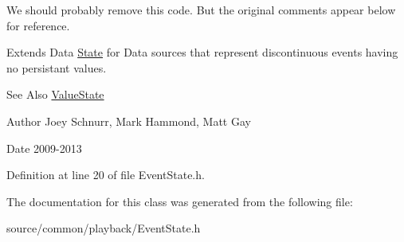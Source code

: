 We should probably remove this code. But the original comments appear below for reference.

Extends Data \hyperlink{class_picto_1_1_state}{State} for Data sources that represent discontinuous events having no persistant values. \begin{DoxySeeAlso}{See Also}
\hyperlink{class_picto_1_1_value_state}{Value\-State} 
\end{DoxySeeAlso}
\begin{DoxyAuthor}{Author}
Joey Schnurr, Mark Hammond, Matt Gay 
\end{DoxyAuthor}
\begin{DoxyDate}{Date}
2009-\/2013 
\end{DoxyDate}


Definition at line 20 of file Event\-State.\-h.



The documentation for this class was generated from the following file\-:\begin{DoxyCompactItemize}
\item 
source/common/playback/Event\-State.\-h\end{DoxyCompactItemize}

